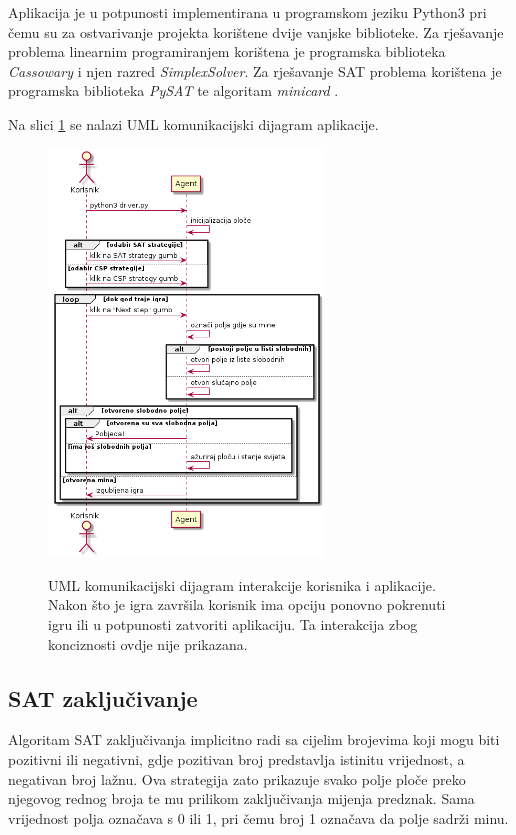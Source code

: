 \documentclass{article}
\numberwithin{figure}{section}
\numberwithin{table}{section}
\begin{document}
Aplikacija je u potpunosti implementirana u programskom jeziku Python3 pri čemu su za
ostvarivanje projekta korištene dvije vanjske biblioteke. Za rješavanje problema linearnim
programiranjem korištena je programska biblioteka \textit{Cassowary} \cite{badros2001cassowary} i njen razred
\textit{SimplexSolver}. Za rješavanje SAT problema korištena je programska biblioteka
\textit{PySAT} \cite{ignatiev2018pysat} te algoritam \textit{minicard} \cite{liffiton2012cardinality}.

Na slici \ref{img:UML_komunikacijski} se nalazi UML komunikacijski dijagram aplikacije.

\begin{figure}[ht]
    \centering
    \includegraphics[width=0.65\textwidth]{images/seq_diagram.png}
    \label{img:UML_komunikacijski}
    \caption{UML komunikacijski dijagram interakcije korisnika i aplikacije. Nakon što je
    igra završila korisnik ima opciju ponovno pokrenuti igru ili u potpunosti zatvoriti
    aplikaciju. Ta interakcija zbog konciznosti ovdje nije prikazana.}
\end{figure}

\subsection{SAT zaključivanje}

Algoritam SAT zaključivanja implicitno radi sa cijelim brojevima koji mogu biti pozitivni ili negativni, gdje pozitivan broj predstavlja istinitu vrijednost, a negativan broj lažnu.
Ova strategija zato prikazuje svako polje ploče preko njegovog rednog broja te mu prilikom zaključivanja mijenja predznak. Sama vrijednost polja označava s 0 ili 1, pri čemu broj 1 označava da polje sadrži minu.
\end{document}
